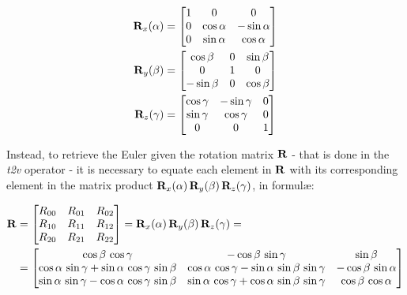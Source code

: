 \begin{align}
    \label{eq:rotx_3d}
    \mathbf{R}_x(\alpha) &= 
        \begin{bmatrix}
            1 & 0 & 0 \\ 0 & \cos\alpha & -\sin\alpha \\ 0 & \sin\alpha & \cos\alpha
        \end{bmatrix} \\
    \label{eq:roty_3d}
    \mathbf{R}_y(\beta) &=
        \begin{bmatrix}
            \cos\beta & 0 & \sin\beta \\ 0 & 1 & 0\\ -\sin\beta & 0 & \cos\beta
        \end{bmatrix} \\
    \label{eq:rotz_3d}
    \mathbf{R}_z(\gamma) &= 
        \begin{bmatrix}
            \cos\gamma & -\sin\gamma & 0 \\ \sin\gamma & \cos\gamma & 0 \\ 0&0&1
        \end{bmatrix} 
\end{align}

Instead, to retrieve the Euler given the rotation matrix $\mathbf{R}$ - that is done in the \textit{t2v} operator - it is necessary to equate each element in $\mathbf{R}$ with its corresponding element in the matrix product $\mathbf{R}_x(\alpha) \, \mathbf{R}_y(\beta)\, \mathbf{R}_z(\gamma)$, in formul\ae:

\begin{align}
    \label{eq:rot_composition_xyz}
    \mathbf{R} &= 
        \begin{bmatrix}
            R_{00} & R_{01} & R_{02} \\
            R_{10} & R_{11} & R_{12} \\
            R_{20} & R_{21} & R_{22} 
        \end{bmatrix}
     = \mathbf{R}_x(\alpha) \, \mathbf{R}_y(\beta)\, \mathbf{R}_z(\gamma) = \\
     &=
        \begin{bmatrix}
            \cos\beta\,\cos\gamma & -\cos\beta\,\sin\gamma & \sin\beta \\
            \cos\alpha\,\sin\gamma + \sin\alpha\,\cos\gamma\,\sin\beta & \cos\alpha\,\cos\gamma - \sin\alpha\,\sin\beta\,\sin\gamma & -\cos\beta\,\sin\alpha \\
            \sin\alpha\,\sin\gamma - \cos\alpha\,\cos\gamma\,\sin\beta & \sin\alpha\,\cos\gamma + \cos\alpha\,\sin\beta\,\sin\gamma & \cos\beta\,\cos\alpha 
        \end{bmatrix} \nonumber
\end{align}

